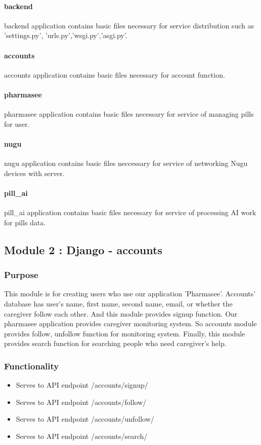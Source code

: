 \documentclass[conference]{IEEEtran}
\begin{document}
\paragraph{backend}
backend application contains basic files necessary for service distribution such as 'settings.py', 'urls.py','wsgi.py','asgi.py'. 
\paragraph{accounts}
accounts application contains basic files necessary for account function. 
\paragraph{pharmasee}
pharmasee application contains basic files necessary for service of managing pills for user.
\paragraph{nugu}
nugu application contains basic files neccessary for service of networking Nugu devices with server. 
\paragraph{pill\_ai}
pill\_ai application contains basic files necessary for service of processing AI work for pills data.  
\\
\subsection{Module 2 : Django - accounts}
\subsubsection{Purpose}
This module is for creating users who use our application 'Pharmasee'. Accounts' database has user's name, first name, second name, email, or whether the caregiver follow each other. And this module provides signup function. Our pharmasee application provides caregiver monitoring system. So accounts module provides follow, unfollow function for monitoring system. Finally, this module provides search function for searching people who need caregiver's help.\\
\subsubsection{Functionality}
\begin{itemize}
    \item Serves to API endpoint /accounts/signup/ 
    \item Serves to API endpoint /accounts/follow/
    \item Serves to API endpoint /accounts/unfollow/
    \item Serves to API endpoint /accounts/search/
\end{itemize}
\bigskip
\end{document}
